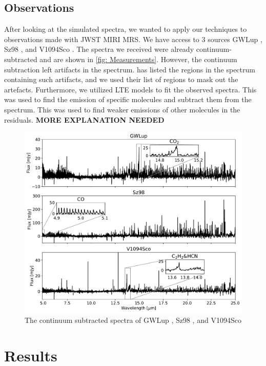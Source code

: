 \documentclass[twoside, single, authoryear, semicolon, 12pt]{lion-msc}
\newcommand{\4}{$_4$}
\newcommand{\3}{$_3$}
\newcommand{\2}{$_2$}
\begin{document}
\section{Observations}
After looking at the simulated spectra, we wanted to apply our techniques to observations made with JWST MIRI MRS. We have access to 3 sources  GWLup \citep{Gasman_2023}, Sz98 \citep{Grant_2023}, and V1094Sco \citep{taboneinprepp}. The spectra we received were already continuum-subtracted and are shown in \autoref{fig: Measurements}. However, the continuum subtraction left artifacts in the spectrum. \cite{Grant_2023} has listed the regions in the spectrum containing such artifacts, and we used their list of regions to mask out the artefacts. Furthermore, we utilized LTE models to fit the observed spectra. This was used to find the emission of specific molecules and subtract them from the spectrum. This was used to find weaker emissions of other molecules in the residuals. 
\textbf{MORE EXPLANATION NEEDED}

\begin{figure}[!ht]
    \centering
    \includegraphics[width=\linewidth]{Figures/Measurements.pdf}
    \caption{The continuum subtracted spectra of GWLup \citep{Gasman_2023}, Sz98 \citep{Grant_2023}, and V1094Sco \citep{taboneinprepp}}
    \label{fig: Measurements}
\end{figure}



\chapter{Results}\label{Ch: Results}
\end{document}
